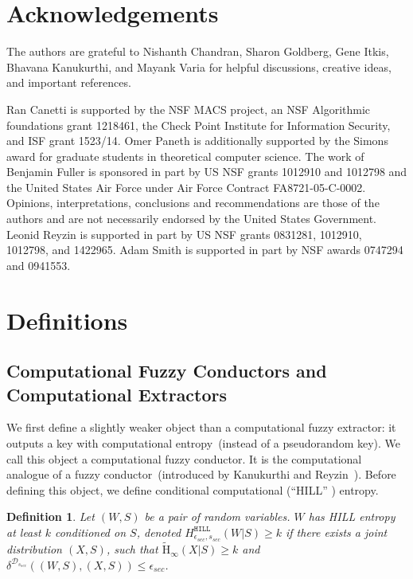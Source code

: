 \documentclass[11pt]{article}
\newtheorem{definition}[theorem]{Definition}
\newcommand{\hill}{\ensuremath{\mathtt{HILL}}\xspace}
\newcommand{\Hav}{\tilde{\mathrm{H}}_\infty}
\newcommand{\blind}[1]{{#1}}
\newcommand{\blind}[1]{}
\begin{document}
\blind{
\section*{Acknowledgements}
The authors are grateful to Nishanth Chandran, Sharon Goldberg, Gene Itkis, Bhavana Kanukurthi, and Mayank Varia for helpful discussions, creative ideas, and important references.

Ran Canetti is supported by the NSF MACS project, an NSF Algorithmic foundations grant 1218461, the Check Point Institute for Information Security, and  ISF grant 1523/14.
Omer Paneth is additionally supported by the Simons award for graduate students in theoretical computer science.
The work of Benjamin Fuller is sponsored in part by US NSF grants 1012910 and 1012798 and  the United States Air Force under Air Force Contract FA8721-05-C-0002. Opinions, interpretations, conclusions and recommendations are those of the authors and are not necessarily endorsed by the United States Government. 
Leonid Reyzin is supported in part by US NSF grants 0831281, 1012910, 1012798, and 1422965.  Adam Smith is supported in part by NSF awards 0747294 and 0941553. 
}



\appendix

\section{Definitions}
\subsection{Computational Fuzzy Conductors and Computational Extractors}
\label{sec:further defs}

We first define a slightly weaker object than a computational fuzzy extractor: it outputs a key with computational entropy~(instead of a pseudorandom key).  
We call this object a computational fuzzy conductor.  It is the computational analogue of a fuzzy conductor~(introduced by Kanukurthi and Reyzin~\cite{KanukurthiR09}).
Before defining this object, we define conditional computational (``HILL'' \cite{DBLP:journals/siamcomp/HastadILL99}) entropy.

\begin{definition}
\label{def:hill ent}
Let $(W, S)$ be a pair of random variables.  $W$ has
\emph{HILL entropy} at least $k$ conditioned on $S$,
denoted $H^{\hill}_{\epsilon_{sec}, s_{sec}}(W|S)\geq k$ if there exists a joint distribution $(X, S)$, such that $\Hav(X|S)\geq k$ and $\delta^{\mathcal{D}_{s_{sec}}} ((W, S), \allowbreak (X,S))\leq \epsilon_{sec}$.
\end{definition}
\end{document}
